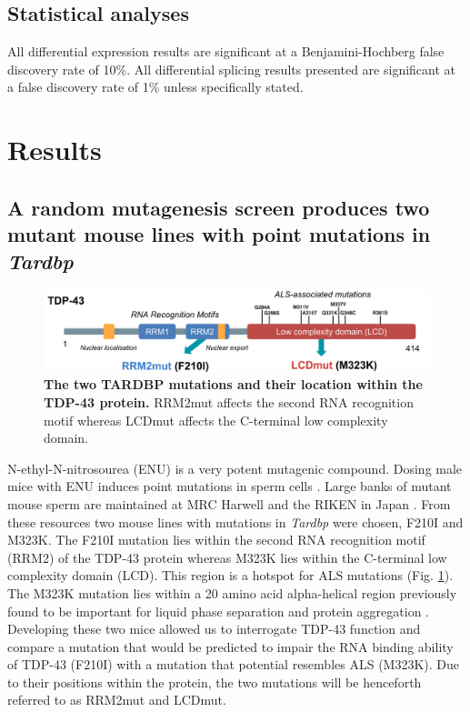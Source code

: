 \subsection{Statistical analyses}
All differential expression results are significant at a Benjamini-Hochberg false discovery rate of 10\%. 
All  differential  splicing  results  presented  are  significant  at  a  false  discovery  rate  of  1\%  unless specifically stated.

\section{Results}

\subsection{A random mutagenesis screen produces two mutant mouse lines with point mutations in \textit{Tardbp}}

\begin{figure}[h!]
	\centering
	\includegraphics[width=\textwidth]{Figures/05_tdp_mice/TDP_structure_mutations.png}
	\caption[The two TARDBP mutations and their location within the TDP-43 protein]{
		\textbf{The two TARDBP mutations and their location within the TDP-43 protein.}
		RRM2mut affects the second RNA recognition motif whereas LCDmut affects the C-terminal low complexity domain.
	}
	\label{fig:tdp_structure}
\end{figure}

N-ethyl-N-nitrosourea (ENU) is a very potent mutagenic compound. Dosing male mice with ENU induces point mutations in sperm cells \citep{DeAngelis2000}. 
Large banks of mutant mouse sperm are maintained at MRC Harwell \citep{Acevedo2008} and the RIKEN in Japan \citep{Gondo2010}. 
From these resources two mouse lines with mutations in \textit{Tardbp} were chosen, F210I and M323K. 
The F210I mutation lies within the second RNA recognition motif (RRM2) of the TDP-43 protein whereas M323K lies within the C-terminal low complexity domain (LCD). 
This region is a hotspot for ALS mutations (Fig. \ref{fig:tdp_structure}). 
The M323K mutation lies within a 20 amino acid alpha-helical region previously found to be important for liquid phase separation and protein aggregation \citep{Conicella2016}. 
Developing these two mice allowed us to interrogate TDP-43 function and compare a mutation that would be predicted to impair the RNA binding ability of TDP-43 (F210I) with a mutation that potential resembles ALS (M323K). 
Due to their positions within the protein, the two mutations will be henceforth referred to as RRM2mut and LCDmut.

